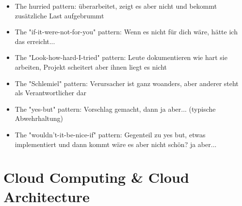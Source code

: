 \documentclass[paper=a4, fontsize=11pt]{scrartcl} %
\numberwithin{equation}{section} %
\numberwithin{figure}{section} %
\numberwithin{table}{section} %
\begin{document}
\begin{itemize}
\begin{itemize}
    \item The hurried pattern: überarbeitet, zeigt es aber nicht und bekommt zusätzliche Last aufgebrummt
    \item The "if-it-were-not-for-you" pattern: Wenn es nicht für dich wäre, hätte ich das erreicht...
    \item The "Look-how-hard-I-tried" pattern: Leute dokumentieren wie hart sie arbeiten, Projekt scheitert aber ihnen liegt es nicht
    \item The "Schlemiel" pattern: Verursacher ist ganz woanders, aber anderer steht als Verantwortlicher dar
    \item The "yes-but" pattern: Vorschlag gemacht, dann ja aber... (typische Abwehrhaltung)
    \item The "wouldn't-it-be-nice-if" pattern: Gegenteil zu yes but, etwas implementiert und dann kommt wäre es aber nicht schön? ja aber...
  \end{itemize}
\end{itemize}

\section{Cloud Computing \& Cloud Architecture}
\end{document}
